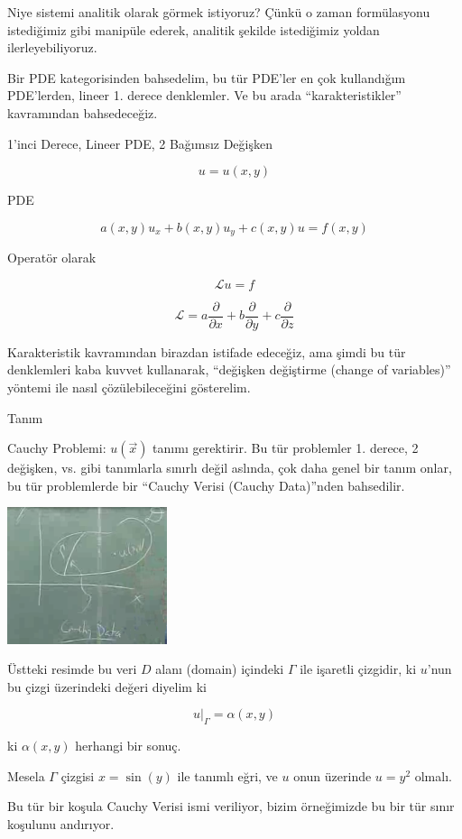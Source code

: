 \documentclass[12pt,fleqn]{article}\usepackage{../../common}
\begin{document}
Niye sistemi analitik olarak görmek istiyoruz? Çünkü o zaman formülasyonu
istediğimiz gibi manipüle ederek, analitik şekilde istediğimiz yoldan
ilerleyebiliyoruz.

Bir PDE kategorisinden bahsedelim, bu tür PDE'ler en çok kullandığım
PDE'lerden, lineer 1. derece denklemler. Ve bu arada ``karakteristikler''
kavramından bahsedeceğiz. 

1'inci Derece, Lineer PDE, 2 Bağımsız Değişken

$$ u = u(x,y) $$

PDE

$$ a(x,y)u_x + b(x,y)u_y + c(x,y)u = f(x,y) $$

Operatör olarak 

$$ \mathcal{L}u = f $$

$$ \mathcal{L} = a \frac{\partial }{\partial x} +
b \frac{\partial }{\partial y} +
c \frac{\partial }{\partial z} 
$$

Karakteristik kavramından birazdan istifade edeceğiz, ama şimdi bu tür
denklemleri kaba kuvvet kullanarak, ``değişken değiştirme (change of
variables)'' yöntemi ile nasıl çözülebileceğini gösterelim. 

Tanım

Cauchy Problemi: $u(\vec{x})$ tanımı gerektirir. Bu tür problemler
1. derece, 2 değişken, vs. gibi tanımlarla sınırlı değil aslında, çok daha
genel bir tanım onlar, bu tür problemlerde bir ``Cauchy Verisi (Cauchy
Data)''nden bahsedilir.

\includegraphics[height=4cm]{1_11.png}

Üstteki resimde bu veri $D$ alanı (domain) içindeki $\Gamma$ ile işaretli
çizgidir, ki $u$'nun bu çizgi üzerindeki değeri diyelim ki

$$ u|_{\Gamma} = \alpha(x,y) $$

ki $\alpha(x,y)$ herhangi bir sonuç. 

Mesela $\Gamma$ çizgisi $x=\sin(y)$ ile tanımlı eğri, ve $u$ onun üzerinde
$u=y^2$ olmalı.

Bu tür bir koşula Cauchy Verisi ismi veriliyor, bizim örneğimizde bu bir
tür sınır koşulunu andırıyor.
\end{document}
